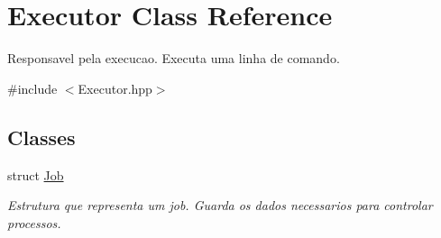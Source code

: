 \hypertarget{classExecutor}{
\section{Executor Class Reference}
\label{classExecutor}
}


Responsavel pela execucao. Executa uma linha de comando.  




{\ttfamily \#include $<$Executor.hpp$>$}

\subsection*{Classes}
\begin{DoxyCompactItemize}
\item 
struct \hyperlink{structExecutor_1_1Job}{Job}
\begin{DoxyCompactList}\small\item\em Estrutura que representa um job. Guarda os dados necessarios para controlar processos. \item\end{DoxyCompactList}\end{DoxyCompactItemize}
